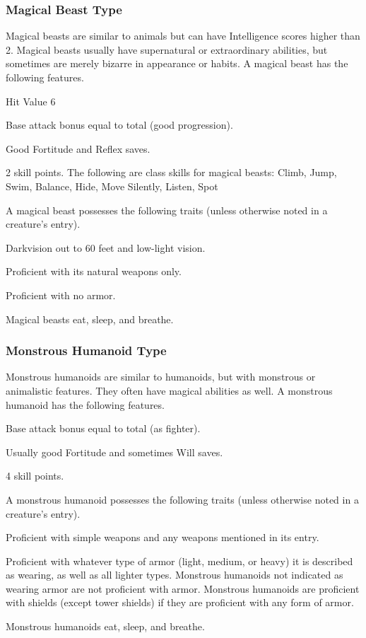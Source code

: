 {\subsubsection{Magical Beast Type} Magical beasts are similar to animals but can have Intelligence scores higher than 2. Magical beasts usually have supernatural or extraordinary abilities, but sometimes are merely bizarre in appearance or habits.
 A magical beast has the following features.
\begin{itemize*}
\item Hit Value 6
\item Base attack bonus equal to total  (good progression).
\item Good Fortitude and Reflex saves.
\item 2 skill points. The following are class skills for magical beasts: Climb, Jump, Swim, Balance, Hide, Move Silently, Listen, Spot
\end{itemize*}
 A magical beast possesses the following traits (unless otherwise noted in a creature's entry).
\begin{itemize*}
\item Darkvision out to 60 feet and low-light vision.
\item Proficient with its natural weapons only.
\item Proficient with no armor.
\item Magical beasts eat, sleep, and breathe.
\end{itemize*}

\subsubsection{Monstrous Humanoid Type} Monstrous humanoids are similar to humanoids, but with monstrous or animalistic features. They often have magical abilities as well.
 A monstrous humanoid has the following features.
\begin{itemize*}
\item Base attack bonus equal to total  (as fighter).
\item Usually good Fortitude and sometimes Will saves.
\item 4 skill points.
\end{itemize*}
 A monstrous humanoid possesses the following traits (unless otherwise noted in a creature's entry).
\begin{itemize*}
\item Proficient with simple weapons and any weapons mentioned in its entry.
\item Proficient with whatever type of armor (light, medium, or heavy) it is described as wearing, as well as all lighter types. Monstrous humanoids not indicated as wearing armor are not proficient with armor. Monstrous humanoids are proficient with shields (except tower shields) if they are proficient with any form of armor.
\item Monstrous humanoids eat, sleep, and breathe.
\end{itemize*}

}
